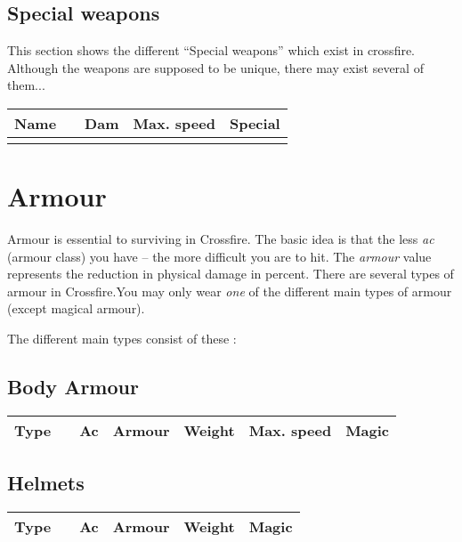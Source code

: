 \documentclass[11pt, a4paper]{article}
\begin{document}
\subsection*{Special weapons}

This section shows the different ``Special weapons'' which exist in
crossfire.  Although the weapons are supposed to be unique, there may
exist several of them...

{\small
\begin{longtable}{|c|c|r|r|p{7cm}|}
\hline
Name&&Dam&Max. speed&Special\\
\hline
\hline
\endhead
\hline
\endfoot

\end{longtable}
}

\section*{Armour}

Armour is essential to surviving in Crossfire.
The basic idea is that the less {\it ac} (armour class) you have -- the more
difficult you are to hit.
The {\it armour} value represents the reduction in physical damage in percent.
There are several types of armour in Crossfire.You may only wear {\em one}
of the different main types of armour (except magical armour).

The different main types consist of these :
\subsection*{Body Armour}

{\small
\begin{center}
\begin{tabular}{|c|c|r|r|r|r|p{4cm}|}
\hline
Type&&Ac& Armour&Weight&Max. speed&Magic\\
\hline
\hline

\hline
\end{tabular}
\end{center}
}
\subsection*{Helmets}

{\small
\begin{center}
\begin{tabular}{|c|c|r|r|r|p{6cm}|}
\hline
Type&&Ac&Armour&Weight&Magic\\
\hline
\hline

\hline
\end{tabular}
\end{center}
}
\end{document}
